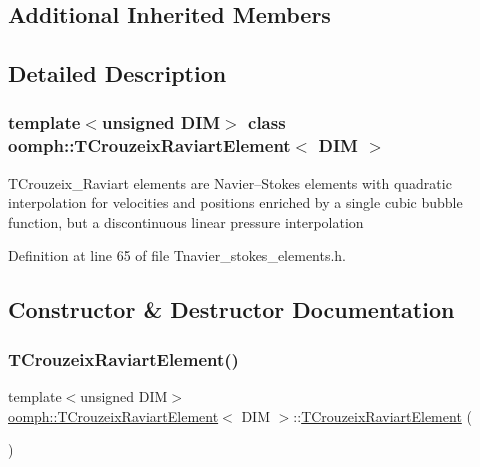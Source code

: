 \subsection*{Additional Inherited Members}


\subsection{Detailed Description}
\subsubsection*{template$<$unsigned D\+IM$>$\newline
class oomph\+::\+T\+Crouzeix\+Raviart\+Element$<$ D\+I\+M $>$}

T\+Crouzeix\+\_\+\+Raviart elements are Navier--Stokes elements with quadratic interpolation for velocities and positions enriched by a single cubic bubble function, but a discontinuous linear pressure interpolation 

Definition at line 65 of file Tnavier\+\_\+stokes\+\_\+elements.\+h.



\subsection{Constructor \& Destructor Documentation}
\mbox{\label{classoomph_1_1TCrouzeixRaviartElement_a5b536954f604a69530cfa3de45a654fd}} 
\subsubsection{\texorpdfstring{T\+Crouzeix\+Raviart\+Element()}{TCrouzeixRaviartElement()}\hspace{0.1cm}{\footnotesize\ttfamily [1/2]}}
{\footnotesize\ttfamily template$<$unsigned D\+IM$>$ \\
\hyperlink{classoomph_1_1TCrouzeixRaviartElement}{oomph\+::\+T\+Crouzeix\+Raviart\+Element}$<$ D\+IM $>$\+::\hyperlink{classoomph_1_1TCrouzeixRaviartElement}{T\+Crouzeix\+Raviart\+Element} (\begin{DoxyParamCaption}{ }\end{DoxyParamCaption})\hspace{0.3cm}{\ttfamily [inline]}}



